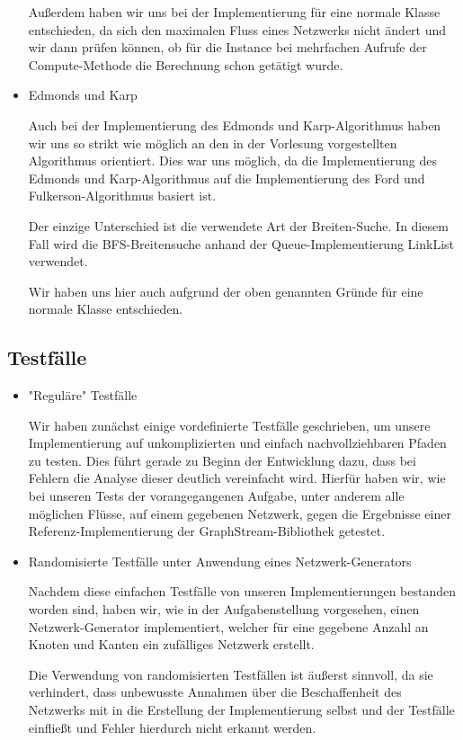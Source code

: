 \documentclass[a4paper]{article}
\begin{document}
\begin{itemize}
\begin{answer}
			Außerdem haben wir uns bei der Implementierung für eine normale Klasse entschieden, da sich den maximalen Fluss eines Netzwerks nicht ändert und wir dann prüfen können, ob für die Instance bei mehrfachen Aufrufe der Compute-Methode die Berechnung schon getätigt wurde.
		\end{answer}
	\item Edmonds und Karp
		\begin{answer}
			Auch bei der Implementierung des Edmonds und Karp-Algorithmus haben wir uns so strikt wie möglich an den in der Vorlesung vorgestellten Algorithmus orientiert.
			Dies war uns möglich, da die Implementierung des Edmonds und Karp-Algorithmus auf die Implementierung des Ford und Fulkerson-Algorithmus basiert ist.

			Der einzige Unterschied ist die verwendete Art der Breiten-Suche.
			In diesem Fall wird die BFS-Breitensuche anhand der Queue-Implementierung LinkList verwendet.

			Wir haben uns hier auch aufgrund der oben genannten Gründe für eine normale Klasse entschieden.
		\end{answer}
\end{itemize}

\subsection{Testfälle}
\begin{itemize}
	\item "Reguläre" Testfälle
	\begin{answer}
		Wir haben zunächst einige vordefinierte Testfälle geschrieben, um unsere Implementierung auf unkomplizierten und einfach nachvollziehbaren Pfaden zu testen.
		Dies führt gerade zu Beginn der Entwicklung dazu, dass bei Fehlern die Analyse dieser deutlich vereinfacht wird.
		Hierfür haben wir, wie bei unseren Tests der vorangegangenen Aufgabe, unter anderem alle möglichen Flüsse, auf einem gegebenen Netzwerk, gegen die Ergebnisse einer Referenz-Implementierung der GraphStream-Bibliothek getestet.
	\end{answer}
	\item Randomisierte Testfälle unter Anwendung eines Netzwerk-Generators
		\begin{answer}
			Nachdem diese einfachen Testfälle von unseren Implementierungen bestanden worden sind, haben wir, wie in der Aufgabenstellung vorgesehen, einen Netzwerk-Generator implementiert, welcher für eine gegebene Anzahl an Knoten und Kanten ein zufälliges Netzwerk erstellt.

			Die Verwendung von randomisierten Testfällen ist äußerst sinnvoll, da sie verhindert, dass unbewusste Annahmen über die Beschaffenheit des Netzwerks mit in die Erstellung der Implementierung selbst und der Testfälle einfließt und Fehler hierdurch nicht erkannt werden.
		\end{answer}
\end{itemize}
\end{document}
